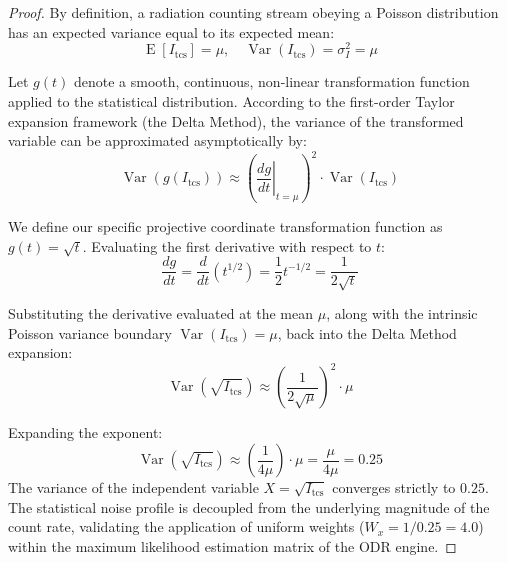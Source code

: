 \documentclass[review]{elsarticle} %
\begin{document}
\begin{proof}
By definition, a radiation counting stream obeying a Poisson distribution has an expected variance equal to its expected mean:
\begin{equation}
    \operatorname{E}[I_{\text{tcs}}] = \mu, \quad \operatorname{Var}(I_{\text{tcs}}) = \sigma^2_{I} = \mu
\end{equation}

Let $g(t)$ denote a smooth, continuous, non-linear transformation function applied to the statistical distribution. According to the first-order Taylor expansion framework (the Delta Method), the variance of the transformed variable can be approximated asymptotically by:
\begin{equation}
    \operatorname{Var}(g(I_{\text{tcs}})) \approx \left( \left. \frac{dg}{dt} \right|_{t=\mu} \right)^2 \cdot \operatorname{Var}(I_{\text{tcs}})
\end{equation}

We define our specific projective coordinate transformation function as $g(t) = \sqrt{t}$. Evaluating the first derivative with respect to $t$:
\begin{equation}
    \frac{dg}{dt} = \frac{d}{dt}(t^{1/2}) = \frac{1}{2}t^{-1/2} = \frac{1}{2\sqrt{t}}
\end{equation}

Substituting the derivative evaluated at the mean $\mu$, along with the intrinsic Poisson variance boundary $\operatorname{Var}(I_{\text{tcs}}) = \mu$, back into the Delta Method expansion:
\begin{equation}
    \operatorname{Var}(\sqrt{I_{\text{tcs}}}) \approx \left( \frac{1}{2\sqrt{\mu}} \right)^2 \cdot \mu
\end{equation}

Expanding the exponent:
\begin{equation}
    \operatorname{Var}(\sqrt{I_{\text{tcs}}}) \approx \left( \frac{1}{4\mu} \right) \cdot \mu = \frac{\mu}{4\mu} = 0.25
\end{equation}
The variance of the independent variable $X = \sqrt{I_{\text{tcs}}}$ converges strictly to $0.25$. The statistical noise profile is decoupled from the underlying magnitude of the count rate, validating the application of uniform weights ($W_x = 1/0.25 = 4.0$) within the maximum likelihood estimation matrix of the ODR engine.
\end{proof}
\end{document}
